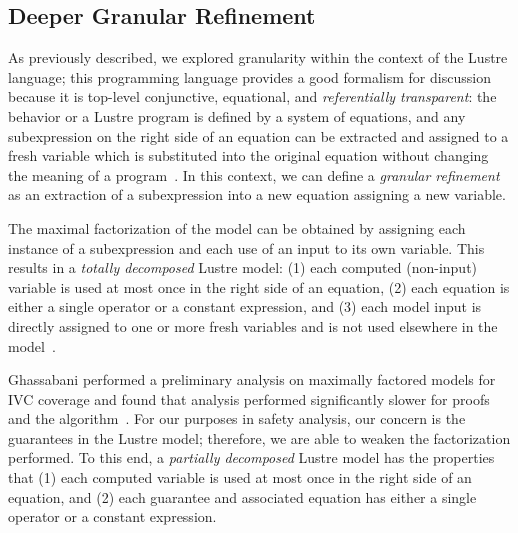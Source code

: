 \subsection{Deeper Granular Refinement}
\label{sec:granularityFRESHAlg}


As previously described, we explored granularity within the context of the Lustre language; this programming language provides a good formalism for discussion because it is top-level conjunctive, equational, and \emph{referentially transparent}: the behavior or a Lustre program is defined by a system of equations, and any subexpression on the right side of an equation can be extracted and assigned to a fresh variable which is substituted into the original equation without changing the meaning of a program~\cite{Halbwachs91:IEEE,ghassabani_2018}. In this context, we can define a \emph{granular refinement} as an extraction of a subexpression into a new equation assigning a new variable. 

The maximal factorization of the model can be obtained by assigning each instance of a subexpression and each use of an input to its own variable. This results in a \emph{totally decomposed} Lustre model: (1) each computed (non-input) variable is used at most once in the right side of an equation, (2) each equation is either a single operator or a constant expression, and (3) each model input is directly assigned to one or more fresh variables and is not used elsewhere in the model~\cite{ghassabani_2018}.

Ghassabani performed a preliminary analysis on maximally factored models for IVC coverage and found that analysis performed significantly slower for proofs and the \ivcmust algorithm~\cite{ghassabani_2018}. For our purposes in safety analysis, our concern is the guarantees in the Lustre model; therefore, we are able to weaken the factorization performed. To this end, a \emph{partially decomposed} Lustre model has the properties that (1) each computed variable is used at most once in the right side of an equation, and (2) each guarantee and associated equation has either a single operator or a constant expression. 










